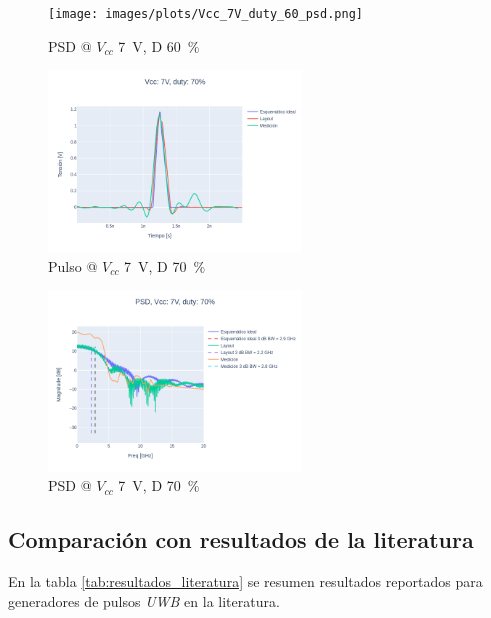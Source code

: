 \begin{figure}
  \centering
    \texttt{[image: images/plots/Vcc\_7V\_duty\_60\_psd.png]}
    \caption{PSD @ $V_{cc}$ \qty{7}{\volt}, D \qty{60}{\percent} }
    \label{fig:psd_7v_60}
\end{figure}

\begin{figure}
  \centering
    \includegraphics[width=0.6\textwidth]{images/plots/Vcc_7V_duty_70_time_domain.png}
    \caption{Pulso @ $V_{cc}$ \qty{7}{\volt}, D \qty{70}{\percent} }
    \label{fig:plots_7v_70}
\end{figure}

\begin{figure}
  \centering
    \includegraphics[width=0.6\textwidth]{images/plots/Vcc_7V_duty_70_psd.png}
    \caption{PSD @ $V_{cc}$ \qty{7}{\volt}, D \qty{70}{\percent} }
    \label{fig:psd_7v_70}
\end{figure}

\subsection{Comparación con resultados de la literatura}

En la tabla \ref{tab:resultados_literatura} se resumen resultados reportados
para generadores de pulsos \textit{UWB} en la literatura.

